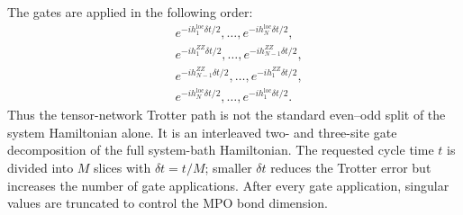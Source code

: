 \documentclass[aps,pra,twocolumn,superscriptaddress,nolongbibliography,nobalancelastpage,10pt]{revtex4-2}
\begin{document}
The gates are applied in the following order:
\begin{equation}
	\begin{aligned}
		& e^{-i h_1^{\mathrm{loc}}\delta t/2},\ldots,
		e^{-i h_N^{\mathrm{loc}}\delta t/2},\\
		& e^{-i h_1^{ZZ}\delta t/2},\ldots,
		e^{-i h_{N-1}^{ZZ}\delta t/2},\\
		& e^{-i h_{N-1}^{ZZ}\delta t/2},\ldots,
		e^{-i h_1^{ZZ}\delta t/2},\\
		& e^{-i h_N^{\mathrm{loc}}\delta t/2},\ldots,
		e^{-i h_1^{\mathrm{loc}}\delta t/2}.
	\end{aligned}
\end{equation}
Thus the tensor-network Trotter path is not the standard even--odd split of
the system Hamiltonian alone.  It is an interleaved two- and three-site gate
decomposition of the full system-bath Hamiltonian.  The requested cycle time
$t$ is divided into $M$ slices with $\delta t=t/M$; smaller $\delta t$ reduces
the Trotter error but increases the number of gate applications.  After every
gate application, singular values are truncated to control the MPO bond
dimension.
\end{document}
